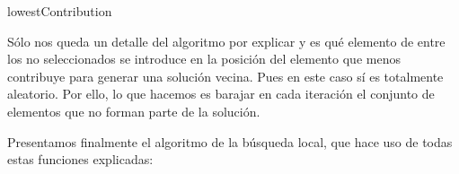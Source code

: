 \documentclass[10pt,a4paper]{article}
\begin{document}
	\begin{algorithm}[H]
	\caption{\sc lowestContribution}
	\end{algorithm}
\vspace{8mm}
 	Sólo nos queda un detalle del algoritmo por explicar y es qué elemento de entre los no seleccionados se introduce en la posición del elemento que menos contribuye para generar una solución vecina. Pues en este caso sí es totalmente aleatorio. Por ello, lo que hacemos es barajar en cada iteración el conjunto de elementos que no forman parte de la solución. 

	Presentamos finalmente el algoritmo de la búsqueda local, que hace uso de todas estas funciones explicadas:
	
\end{document}
